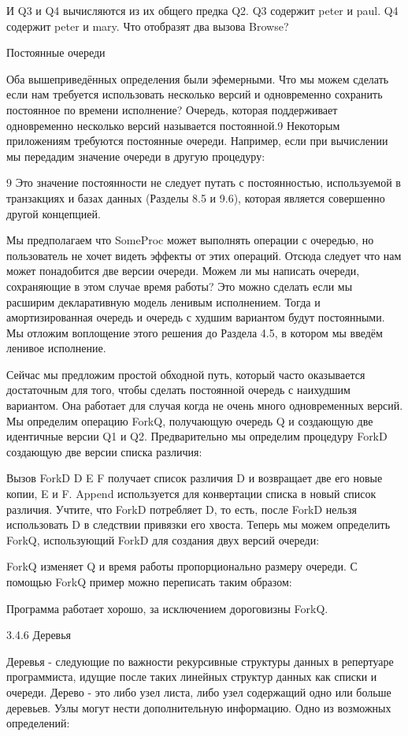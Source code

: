 И Q3 и Q4 вычисляются из их общего предка Q2. Q3 содержит peter и paul. Q4 содержит peter и mary. Что отобразят два вызова Browse?

Постоянные очереди

Оба вышеприведённых определения были эфемерными. Что мы можем сделать если нам требуется использовать несколько версий и одновременно сохранить постоянное по времени исполнение? Очередь, которая поддерживает одновременно несколько версий называется постоянной.9 Некоторым приложениям требуются постоянные очереди. Например, если при вычислении мы передадим значение очереди в другую процедуру:

9 Это значение постоянности не следует путать с постоянностью, используемой в транзакциях и базах данных (Разделы 8.5 и 9.6), которая является совершенно другой концепцией.

Мы предполагаем что SomeProc может выполнять операции с очередью, но пользователь не хочет видеть эффекты от этих операций. Отсюда следует что нам может понадобится две версии очереди. Можем ли мы написать очереди, сохраняющие в этом случае время работы? Это можно сделать если мы расширим декларативную модель ленивым исполнением. Тогда и амортизированная очередь и очередь с худшим вариантом будут постоянными. Мы отложим воплощение этого решения до Раздела 4.5, в котором мы введём ленивое исполнение.

Сейчас мы предложим простой обходной путь, который часто оказывается достаточным для того, чтобы сделать постоянной очередь с наихудшим вариантом. Она работает для случая когда не очень много одновременных версий. Мы определим операцию ForkQ, получающую очередь Q и создающую две идентичные версии Q1 и Q2. Предварительно мы определим процедуру ForkD создающую две версии списка различия:

Вызов {ForkD D E F} получает список различия D и возвращает две его новые копии, E и F. Append используется для конвертации списка в новый список различия. Учтите, что ForkD потребляет D, то есть, после ForkD нельзя использовать D в следствии привязки его хвоста. Теперь мы можем определить ForkQ, использующий ForkD для создания двух версий очереди:

ForkQ изменяет Q и время работы пропорционально размеру очереди. С помощью ForkQ пример можно переписать таким образом:

Программа работает хорошо, за исключением дороговизны ForkQ.

3.4.6 Деревья

Деревья - следующие по важности рекурсивные структуры данных в репертуаре программиста, идущие после таких линейных структур данных как списки и очереди. Дерево - это либо узел листа, либо узел содержащий одно или больше деревьев. Узлы могут нести дополнительную информацию. Одно из возможных определений:

